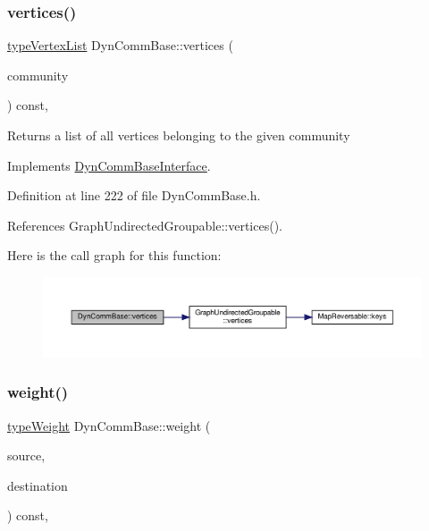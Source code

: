 \subsubsection{\texorpdfstring{vertices()}{vertices()}\hspace{0.1cm}{\footnotesize\ttfamily [2/2]}}
{\footnotesize\ttfamily \hyperlink{graphInterface_8h_a21d54d8a139def524d3b0d6f71ec4974}{type\+Vertex\+List} Dyn\+Comm\+Base\+::vertices (\begin{DoxyParamCaption}\item[{\hyperlink{graphUndirectedGroupable_8h_a914da95c9ea7f14f4b7f875c36818556}{type\+Community}}]{community }\end{DoxyParamCaption}) const\hspace{0.3cm}{\ttfamily [inline]}, {\ttfamily [virtual]}}

\begin{DoxyReturn}{Returns}
a list of all vertices belonging to the given community 
\end{DoxyReturn}


Implements \hyperlink{classDynCommBaseInterface_ab178106e07cf3ad86ce2deb17dd5666e}{Dyn\+Comm\+Base\+Interface}.



Definition at line 222 of file Dyn\+Comm\+Base.\+h.



References Graph\+Undirected\+Groupable\+::vertices().

Here is the call graph for this function\+:
\nopagebreak
\begin{figure}[H]
\begin{center}
\leavevmode
\includegraphics[width=350pt]{classDynCommBase_ae56cd1fc5a69fcd4d0e0a073f3f2e36b_cgraph}
\end{center}
\end{figure}
\mbox{\label{classDynCommBase_ae48a572da3c7b375429e96e717b15787}} 
\subsubsection{\texorpdfstring{weight()}{weight()}}
{\footnotesize\ttfamily \hyperlink{edge_8h_a2e7ea3be891ac8b52f749ec73fee6dd2}{type\+Weight} Dyn\+Comm\+Base\+::weight (\begin{DoxyParamCaption}\item[{const \hyperlink{edge_8h_a5fbd20c46956d479cb10afc9855223f6}{type\+Vertex} \&}]{source,  }\item[{const \hyperlink{edge_8h_a5fbd20c46956d479cb10afc9855223f6}{type\+Vertex} \&}]{destination }\end{DoxyParamCaption}) const\hspace{0.3cm}{\ttfamily [inline]}, {\ttfamily [virtual]}}

